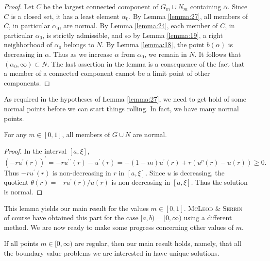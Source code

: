 \begin{proof}
  Let $C$ be the largest connected component of $G_m \cup N_m$ containing $\bar{\alpha}$.
  Since $C$ is a closed set, it has a least element $\alpha_0$.
  By Lemma \ref{lemma:27}, all members of $C$, in particular $\alpha_0$, are normal.
  By Lemma \ref{lemma:24}, each member of $C$, in particular $\alpha_0$, is strictly admissible,
  and so by Lemma \ref{lemma:19}, a right neighborhood of $\alpha_0$ belongs to $N$.
  By Lemma \ref{lemma:18}, the point $b(\alpha)$ is decreasing in $\alpha$.
  Thus as we increase $\alpha$ from $\alpha_0$, we remain in $N$.
  It follows that $\left(\alpha_0, \infty\right) \subset N$.
  The last assertion in the lemma is a consequence of the fact that
  a member of a connected component cannot be a limit point of other components.
\end{proof}

As required in the hypotheses of Lemma \ref{lemma:27}, we need to get hold of some normal points
before we can start things rolling. In fact, we have many normal points.

\begin{lemma}\label{lemma:29}
  For any $m \in[0,1]$, all members of $G \cup N$ are normal.
\end{lemma}

\begin{proof}
  In the interval $[a, \xi]$,
  \begin{equation}\label{eq:4.16}
    \left(-r u^{\prime}(r)\right)^{\prime} = -r u^{\prime \prime}(r)-u^{\prime}(r)
      = -(1-m) u^{\prime}(r)+r\left(u^p(r)-u(r)\right) \geq 0 .
  \end{equation}
  Thus $-r u^{\prime}(r)$ is non-decreasing in $r$ in $[a, \xi]$.
  Since $u$ is decreasing, the quotient $\theta(r)=-r u^{\prime}(r) / u(r)$ is
  non-decreasing in $[a,\xi]$. Thus the solution is normal.
\end{proof}

This lemma yields our main result for the values $m \in[0,1]$.
\textsc{McLeod} \& \textsc{Serrin} of course have obtained this part for the case 
$[a, b)=[0, \infty)$ using a different method. We are now ready to make some progress 
concerning other values of $m$.

\begin{lemma}\label{lemma:30}
  If all points $m \in[0, \infty)$ are regular, then our main result holds, namely,
  that all the boundary value problems we are interested in have unique solutions.
\end{lemma}

